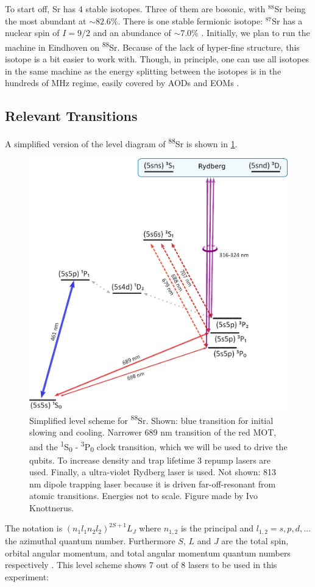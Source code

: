 To start off, Sr has 4 stable isotopes.
Three of them are bosonic, with ${}^{88}$Sr being the most abundant at $\sim82.6\%$. There is one stable fermionic isotope: ${}^{87}$Sr has a nuclear spin of $I=9/2$ and an abundance of $\sim7.0\%$ \cite{Coursey1999}.
Initially, we plan to run the machine in Eindhoven on \textsuperscript{88}Sr. 
Because of the lack of hyper-fine structure, this isotope is a bit easier to work with.
Though, in principle, one can use all isotopes in the same machine as the energy splitting between the isotopes is in the hundreds of MHz regime, easily covered by AODs and EOMs \cite{Stellmer2013}.

\subsection{Relevant Transitions}

A simplified version of the level diagram of \textsuperscript{88}Sr is shown in \cref{fig:SrLevel}. 
\begin{figure}
	\centering
	\includegraphics[width=0.76\linewidth]{figures/SrLevelRydberg.pdf}
	\caption{Simplified level scheme for \textsuperscript{88}Sr. 
	Shown: blue transition for initial slowing and cooling.
	Narrower 689 nm transition of the red \ac{MOT}, and the \textsuperscript{1}S\textsubscript{0} - \textsuperscript{3}P\textsubscript{0} clock transition, which we will be used to drive the qubits. 
	To increase density and trap lifetime 3 repump lasers are used. 
	Finally, a ultra-violet Rydberg laser is used.
	Not shown: 813 nm dipole trapping laser because it is driven far-off-resonant from atomic transitions. Energies not to scale. Figure made by Ivo Knottnerus.}
	\label{fig:SrLevel}
\end{figure}
The notation is $(n_1l_1 n_2l_2)^{2S+1}L_J$ where $n_{1,2}$ is the principal and $l_{1,2} = s, p, d, \ldots$ the azimuthal quantum number. 
Furthermore $S$, $L$ and $J$ are the total spin, orbital angular momentum, and total angular momentum quantum numbers respectively \cite{Cowan1981}. 
This level scheme shows 7 out of 8 lasers to be used in this experiment:

